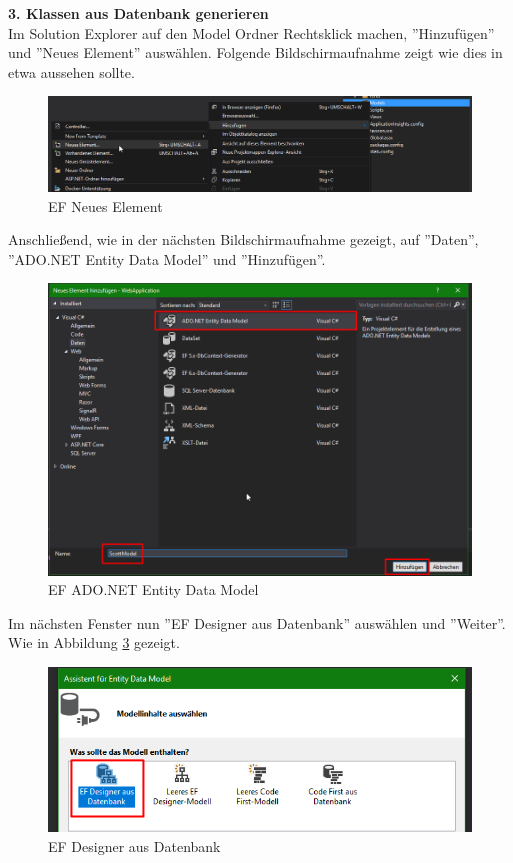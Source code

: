 \textbf{3. Klassen aus Datenbank generieren} \\
Im Solution Explorer auf den Model Ordner Rechtsklick machen, ''Hinzufügen'' und ''Neues Element'' auswählen. Folgende Bildschirmaufnahme zeigt wie dies in etwa aussehen sollte.
\begin{figure}[H]
    \centering
    \includegraphics[width=\textwidth]{images/Parser_EFUse03}
    \caption{EF Neues Element}
    \label{fig:parsef03}
\end{figure} 
Anschließend, wie in der nächsten Bildschirmaufnahme gezeigt, auf ''Daten'', ''ADO.NET Entity Data Model'' und ''Hinzufügen''.
\begin{figure}[H]
    \centering
    \includegraphics[width=\textwidth]{images/Parser_EFUse04}
    \caption{EF ADO.NET Entity Data Model}
    \label{fig:parsef04}
\end{figure} 
Im nächsten Fenster nun  ''EF Designer aus Datenbank'' auswählen und ''Weiter''. Wie in Abbildung \ref{fig:parsef05} gezeigt.
\begin{figure}[H]
    \centering
    \includegraphics[width=\textwidth]{images/Parser_EFUse05}
    \caption{EF Designer aus Datenbank}
    \label{fig:parsef05}
\end{figure} 
